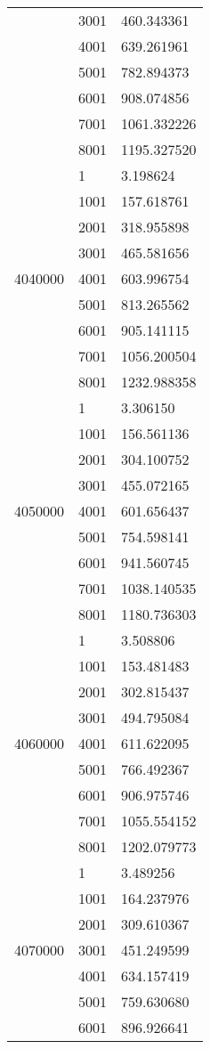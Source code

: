 \begin{table}[htb!]
\begin{tabular}{lll}
 & 3001 & 460.343361 \\
 & 4001 & 639.261961 \\
 & 5001 & 782.894373 \\
 & 6001 & 908.074856 \\
 & 7001 & 1061.332226 \\
 & 8001 & 1195.327520 \\
\multirow[c]{9}{*}{4040000} & 1 & 3.198624 \\
 & 1001 & 157.618761 \\
 & 2001 & 318.955898 \\
 & 3001 & 465.581656 \\
 & 4001 & 603.996754 \\
 & 5001 & 813.265562 \\
 & 6001 & 905.141115 \\
 & 7001 & 1056.200504 \\
 & 8001 & 1232.988358 \\
\multirow[c]{9}{*}{4050000} & 1 & 3.306150 \\
 & 1001 & 156.561136 \\
 & 2001 & 304.100752 \\
 & 3001 & 455.072165 \\
 & 4001 & 601.656437 \\
 & 5001 & 754.598141 \\
 & 6001 & 941.560745 \\
 & 7001 & 1038.140535 \\
 & 8001 & 1180.736303 \\
\multirow[c]{9}{*}{4060000} & 1 & 3.508806 \\
 & 1001 & 153.481483 \\
 & 2001 & 302.815437 \\
 & 3001 & 494.795084 \\
 & 4001 & 611.622095 \\
 & 5001 & 766.492367 \\
 & 6001 & 906.975746 \\
 & 7001 & 1055.554152 \\
 & 8001 & 1202.079773 \\
\multirow[c]{9}{*}{4070000} & 1 & 3.489256 \\
 & 1001 & 164.237976 \\
 & 2001 & 309.610367 \\
 & 3001 & 451.249599 \\
 & 4001 & 634.157419 \\
 & 5001 & 759.630680 \\
 & 6001 & 896.926641 \\

\end{tabular}
\end{table}
